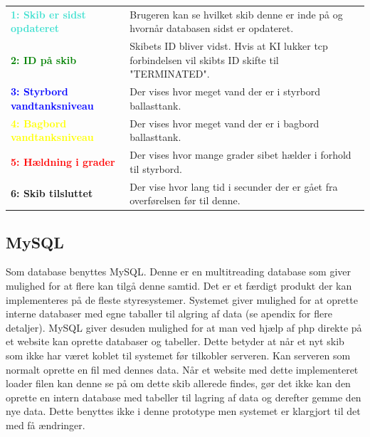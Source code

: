 \begin{table}[H]
\begin{tabular}{p{5cm} p{10cm}}
\hline
\textcolor{Turquoise}{\textbf{1: Skib er sidst opdateret}}
&Brugeren kan se hvilket skib denne er inde på og hvornår databasen sidst er opdateret.\\ 
\textcolor{green}{\textbf{2: ID på skib}}
&Skibets ID bliver vidst. Hvis at KI lukker tcp forbindelsen vil skibts ID skifte til "TERMINATED".\\
\textcolor{blue}{\textbf{3: Styrbord vandtanksniveau}}
&Der vises hvor meget vand der er i styrbord ballasttank.\\
\textcolor{yellow}{\textbf{4: Bagbord vandtanksniveau}}
&Der vises hvor meget vand der er i bagbord ballasttank.\\
\textcolor{red}{\textbf{5: Hældning i grader}}
&Der vises hvor mange grader sibet hælder i forhold til styrbord.\\
\textcolor{RoyalPurple}{\textbf{6: Skib tilsluttet}}
&Der vise hvor lang tid i secunder der er gået fra overførelsen før til denne.\\
\end{tabular}
\end{table}

\subsection{MySQL}
Som database benyttes MySQL. Denne er en multitreading database som giver mulighed for at flere kan tilgå denne samtid. Det er et færdigt produkt der kan implementeres på de fleste styresystemer. Systemet giver mulighed for at oprette interne databaser med egne taballer til algring af data (se apendix for flere detaljer).
MySQL giver desuden mulighed for at man ved hjælp af php direkte på et website kan oprette databaser og tabeller. Dette betyder at når et nyt skib som ikke har været koblet til systemet før tilkobler serveren. Kan serveren som normalt oprette en fil med dennes data. Når et website med dette implementeret loader filen kan denne se på om dette skib allerede findes, gør det ikke kan den oprette en intern database med tabeller til lagring af data og derefter gemme den nye data. Dette benyttes ikke i denne prototype men systemet er klargjort til det med få ændringer.